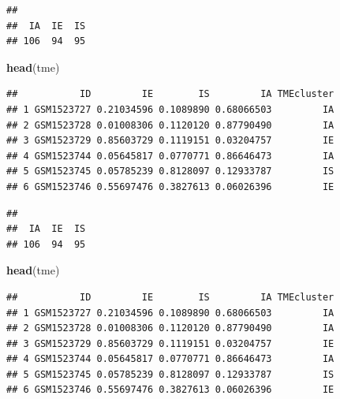 \documentclass[
  12pt,
]{book}
\newenvironment{Shaded}{\begin{snugshade}}{\end{snugshade}}
\newcommand{\FunctionTok}[1]{\textcolor[rgb]{0.13,0.29,0.53}{\textbf{#1}}}
\newcommand{\NormalTok}[1]{#1}
\newcommand{\SpecialCharTok}[1]{\textcolor[rgb]{0.81,0.36,0.00}{\textbf{#1}}}
\theoremstyle{definition}
\theoremstyle{definition}
\theoremstyle{definition}
\theoremstyle{definition}
\theoremstyle{remark}
\begin{document}
\begin{Shaded}
\end{Shaded}

\begin{verbatim}
## 
##  IA  IE  IS 
## 106  94  95
\end{verbatim}

\begin{Shaded}
\begin{Highlighting}[]
\FunctionTok{head}\NormalTok{(tme)}
\end{Highlighting}
\end{Shaded}

\begin{verbatim}
##           ID         IE        IS         IA TMEcluster
## 1 GSM1523727 0.21034596 0.1089890 0.68066503         IA
## 2 GSM1523728 0.01008306 0.1120120 0.87790490         IA
## 3 GSM1523729 0.85603729 0.1119151 0.03204757         IE
## 4 GSM1523744 0.05645817 0.0770771 0.86646473         IA
## 5 GSM1523745 0.05785239 0.8128097 0.12933787         IS
## 6 GSM1523746 0.55697476 0.3827613 0.06026396         IE
\end{verbatim}

\begin{Shaded}
\end{Shaded}

\begin{verbatim}
## 
##  IA  IE  IS 
## 106  94  95
\end{verbatim}

\begin{Shaded}
\begin{Highlighting}[]
\FunctionTok{head}\NormalTok{(tme)}
\end{Highlighting}
\end{Shaded}

\begin{verbatim}
##           ID         IE        IS         IA TMEcluster
## 1 GSM1523727 0.21034596 0.1089890 0.68066503         IA
## 2 GSM1523728 0.01008306 0.1120120 0.87790490         IA
## 3 GSM1523729 0.85603729 0.1119151 0.03204757         IE
## 4 GSM1523744 0.05645817 0.0770771 0.86646473         IA
## 5 GSM1523745 0.05785239 0.8128097 0.12933787         IS
## 6 GSM1523746 0.55697476 0.3827613 0.06026396         IE
\end{verbatim}
\end{document}
